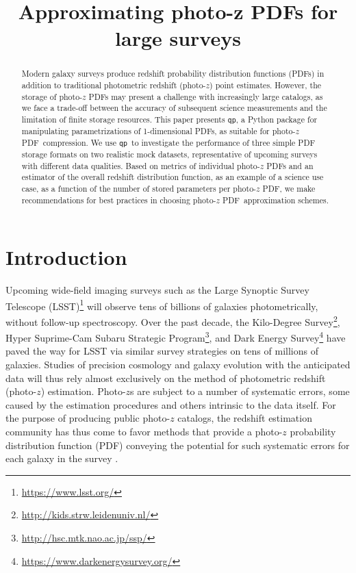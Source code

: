 \documentclass[\docopts]{\docclass}
\newcommand{\qp}{\texttt{qp}}
\newcommand{\pz}{photo-$z$ PDF}
\begin{document}
\title{ Approximating photo-z PDFs for large surveys }


\begin{abstract}

Modern galaxy surveys produce redshift probability distribution functions 
(PDFs) in addition to traditional photometric redshift (photo-$z$) point 
estimates.
However, the storage of \pz s may present a challenge with increasingly large 
catalogs, as we face a trade-off between the accuracy of subsequent science 
measurements and the limitation of finite storage resources.
This paper presents \qp, a Python package for manipulating parametrizations of 
1-dimensional PDFs, as suitable for \pz\ compression.
We use \qp\ to investigate the performance of three simple PDF storage formats 
on two realistic mock datasets, representative of upcoming surveys with 
different data qualities.
Based on metrics of individual \pz s and an estimator of the overall redshift 
distribution function, as an example of a science use case, as a function of 
the number of stored parameters per \pz, we make recommendations for best 
practices in choosing \pz\ approximation schemes.

\end{abstract}


\maketitlepost


\section{Introduction}
\label{sec:intro}


Upcoming wide-field imaging surveys such as the Large Synoptic Survey Telescope 
(LSST)\footnote{\url{https://www.lsst.org/}}\citep{ivezic_lsst:_2008} will 
observe tens of billions of galaxies photometrically, without follow-up 
spectroscopy.
Over the past decade, the Kilo-Degree 
Survey\footnote{\url{http://kids.strw.leidenuniv.nl/}}, Hyper Suprime-Cam 
Subaru Strategic Program\footnote{\url{http://hsc.mtk.nao.ac.jp/ssp/}}, and 
Dark Energy Survey\footnote{\url{https://www.darkenergysurvey.org/}} have paved 
the way for LSST via similar survey strategies on tens of millions of galaxies.
Studies of precision cosmology and galaxy evolution with the anticipated data 
will thus rely almost exclusively on the method of photometric redshift 
(photo-$z$) estimation.
Photo-$z$s are subject to a number of systematic errors, some caused by the 
estimation procedures and others intrinsic to the data itself.
For the purpose of producing public photo-$z$ catalogs, the redshift estimation 
community has thus come to favor methods that provide a photo-$z$ probability 
distribution function (PDF) conveying the potential for such systematic errors 
for each galaxy in the survey \citep{tanaka_photometric_2017, jong_third_2017, 
sheldon_photometric_2012}.
\end{document}
